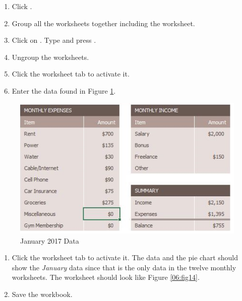 \begin{enumerate}[resume]
	\item Click .
	\item Group all the worksheets together including the  worksheet.
	\item Click on . Type  and press .
	\item Ungroup the worksheets.
	\item Click the  worksheet tab to activate it. 
	\item Enter the data found in Figure \ref{06:fig13}.
\end{enumerate}

\begin{figure}[H]
	\centering
	\includegraphics[width=\maxwidth{.95\linewidth}]{gfx/ch06_fig13}
	\caption{January 2017 Data}
	\label{06:fig13}
\end{figure}

\begin{enumerate}[resume]
	\item Click the  worksheet tab to activate it. The data and the pie chart should show the \textit{January} data since that is the only data in the twelve monthly worksheets. The worksheet should look like Figure \ref{06:fig14}.
	\item Save the  workbook.
\end{enumerate}

